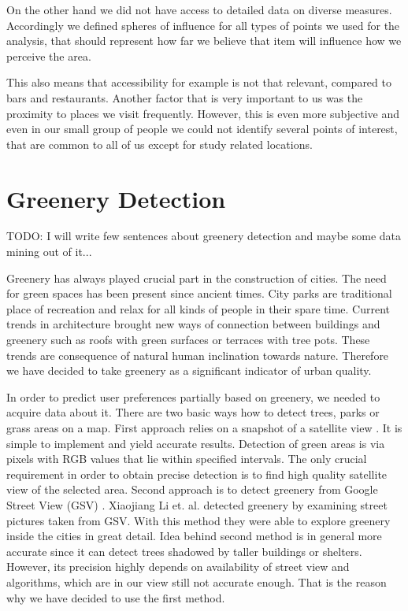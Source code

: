 \documentclass[letterpaper]{article}
\begin{document}
On the other hand we did not have access to detailed data on diverse measures. Accordingly we defined spheres of influence for all types of points we used for the analysis, that should represent how far we believe that item will influence how we perceive the area.

This also means that accessibility for example is not that relevant, compared to bars and restaurants. Another factor that is very important to us was the proximity to places we visit frequently. However, this is even more subjective and even in our small group of people we could not identify several points of interest, that are common to all of us except for study related locations.

\section{Greenery Detection}\label{sec:greenery}
TODO: I will write few sentences about greenery detection and maybe some data mining out of it...

\indent Greenery has always played crucial part in the construction of cities. The need for green spaces has been present since ancient times.
City parks are traditional place of recreation and relax for all kinds of people in their spare time. Current trends in architecture brought new ways of
connection between buildings and greenery such as roofs with green surfaces or terraces with tree pots. These trends are consequence of natural human inclination towards nature. Therefore we have decided to take greenery as a significant indicator of urban quality.

\indent In order to predict user preferences partially based on greenery, we needed to acquire data about it. There are two basic ways how to detect trees, parks or grass areas on a map. First approach relies on a snapshot of a satellite view \cite{smartCities}. It is simple to implement and yield accurate results. Detection of green areas is via pixels with RGB values that lie within specified intervals. The only crucial requirement in order to obtain precise detection is to find high quality satellite view of the selected area.
Second approach is to detect greenery from Google Street View (GSV) \cite{googleView}. Xiaojiang Li et. al. detected greenery by examining street
pictures taken from GSV. With this method they were able to explore greenery inside the cities in great detail. Idea behind second method is in general
more accurate since it can detect trees shadowed by taller buildings or shelters. However, its precision highly depends on availability of street view and
algorithms, which are in our view still not accurate enough. That is the reason why we have decided to use the first method.
\end{document}
